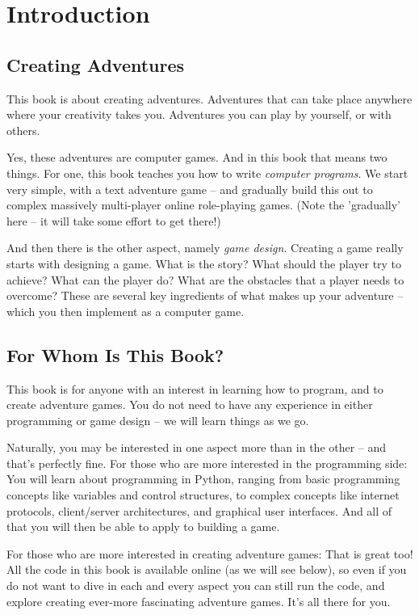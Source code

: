 

\chapter{Introduction} 

\section{Creating Adventures} 

This book is about creating adventures. Adventures that can take place anywhere where your creativity takes you. Adventures you can play by yourself, or with others. 

Yes, these adventures are computer games. And in this book that means two things. For one, this book teaches you how to write \emph{computer programs}. We start very simple, with a text adventure game -- and gradually build this out to complex massively multi-player online role-playing games. (Note the 'gradually' here -- it will take some effort to get there!) 

And then there is the other aspect, namely \emph{game design}. Creating a game really starts with designing a game. What is the story? What should the player try to achieve? What can the player do? What are the obstacles that a player needs to overcome? These are several key ingredients of what makes up your adventure -- which you then implement as a computer game. 

\section{For Whom Is This Book?}

This book is for anyone with an interest in learning how to program, and to create adventure games. You do not need to have any experience in either programming or game design -- we will learn things as we go. 

Naturally, you may be interested in one aspect more than in the other -- and that's perfectly fine. For those who are more interested in the programming side: You will learn about programming in Python, ranging from basic programming concepts like variables and control structures, to complex concepts like internet protocols, client/server architectures, and graphical user interfaces. And all of that you will then be able to apply to building a game. 

For those who are more interested in creating adventure games: That is great too! All the code in this book is available online (as we will see below), so even if you do not want to dive in each and every aspect you can still run the code, and explore creating ever-more fascinating adventure games. It's all there for you.  

